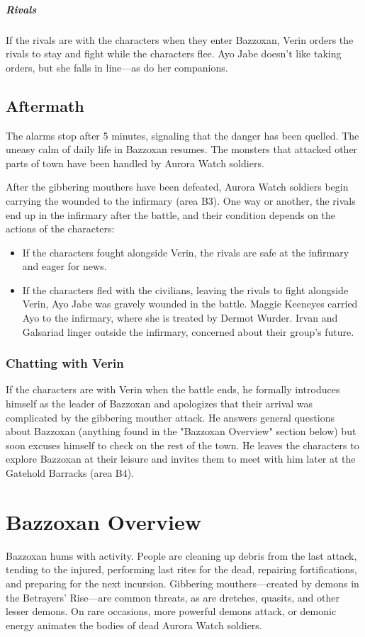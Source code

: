 \documentclass[10pt,a4paper,twoside,bg=print,twocolumn,openany,nodeprecatedcode]{dndbook}
\begin{document}
\subparagraph{Rivals}
If the rivals are with the characters when they enter Bazzoxan, Verin orders the rivals to stay and fight while the characters flee. Ayo Jabe doesn't like taking orders, but she falls in line—as do her companions.

\subsection{Aftermath}
The alarms stop after 5 minutes, signaling that the danger has been quelled. The uneasy calm of daily life in Bazzoxan resumes. The monsters that attacked other parts of town have been handled by Aurora Watch soldiers.

After the gibbering mouthers have been defeated, Aurora Watch soldiers begin carrying the wounded to the infirmary (area B3). One way or another, the rivals end up in the infirmary after the battle, and their condition depends on the actions of the characters:


\begin{itemize}
\item If the characters fought alongside Verin, the rivals are safe at the infirmary and eager for news.
\item If the characters fled with the civilians, leaving the rivals to fight alongside Verin, Ayo Jabe was gravely wounded in the battle. Maggie Keeneyes carried Ayo to the infirmary, where she is treated by Dermot Wurder. Irvan and Galsariad linger outside the infirmary, concerned about their group's future.
\end{itemize}

\subsubsection{Chatting with Verin}
If the characters are with Verin when the battle ends, he formally introduces himself as the leader of Bazzoxan and apologizes that their arrival was complicated by the gibbering mouther attack. He answers general questions about Bazzoxan (anything found in the "Bazzoxan Overview" section below) but soon excuses himself to check on the rest of the town. He leaves the characters to explore Bazzoxan at their leisure and invites them to meet with him later at the Gatehold Barracks (area B4).

\section{Bazzoxan Overview}
Bazzoxan hums with activity. People are cleaning up debris from the last attack, tending to the injured, performing last rites for the dead, repairing fortifications, and preparing for the next incursion. Gibbering mouthers—created by demons in the Betrayers' Rise—are common threats, as are dretches, quasits, and other lesser demons. On rare occasions, more powerful demons attack, or demonic energy animates the bodies of dead Aurora Watch soldiers.
\end{document}
